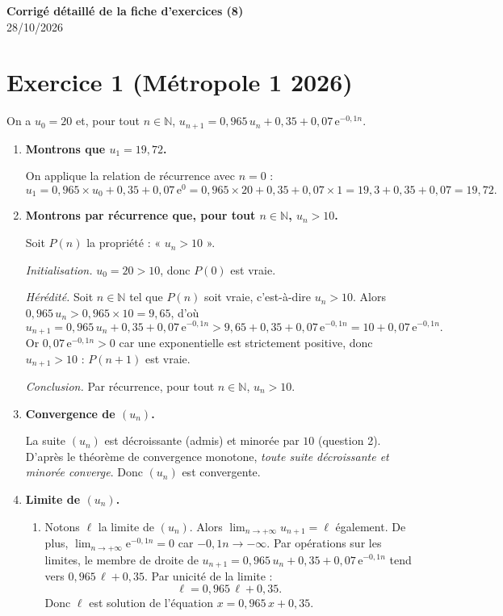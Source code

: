 \documentclass[11pt,a4paper]{article}
\newcommand{\e}{\mathrm{e}}
\newcommand{\exo}[1]{\section*{#1}}
\begin{document}
\begin{center}
{\Large\bfseries Corrigé détaillé de la fiche d'exercices (8)}\\[2pt]
28/10/2026
\end{center}

\exo{Exercice 1 (Métropole 1 2026)}

On a $u_0 = 20$ et, pour tout $n\in\mathbb{N}$,
$u_{n+1} = 0{,}965\,u_n + 0{,}35 + 0{,}07\,\e^{-0{,}1n}$.

\begin{enumerate}

\item \textbf{Montrons que $u_1 = 19{,}72$.}

On applique la relation de récurrence avec $n=0$ :
\[
u_1 = 0{,}965\times u_0 + 0{,}35 + 0{,}07\,\e^{0}
= 0{,}965\times 20 + 0{,}35 + 0{,}07\times 1
= 19{,}3 + 0{,}35 + 0{,}07 = 19{,}72.
\]

\item \textbf{Montrons par récurrence que, pour tout $n\in\mathbb{N}$, $u_n > 10$.}

Soit $P(n)$ la propriété : « $u_n > 10$ ».

\emph{Initialisation.} $u_0 = 20 > 10$, donc $P(0)$ est vraie.

\emph{Hérédité.} Soit $n\in\mathbb{N}$ tel que $P(n)$ soit vraie, c'est-à-dire $u_n > 10$.
Alors $0{,}965\,u_n > 0{,}965\times 10 = 9{,}65$, d'où
\[
u_{n+1} = 0{,}965\,u_n + 0{,}35 + 0{,}07\,\e^{-0{,}1n}
> 9{,}65 + 0{,}35 + 0{,}07\,\e^{-0{,}1n}
= 10 + 0{,}07\,\e^{-0{,}1n}.
\]
Or $0{,}07\,\e^{-0{,}1n} > 0$ car une exponentielle est strictement positive, donc $u_{n+1} > 10$ : $P(n+1)$ est vraie.

\emph{Conclusion.} Par récurrence, pour tout $n\in\mathbb{N}$, $u_n > 10$.

\item \textbf{Convergence de $(u_n)$.}

La suite $(u_n)$ est décroissante (admis) et minorée par $10$ (question 2).
D'après le théorème de convergence monotone, \emph{toute suite décroissante et minorée converge}.
Donc $(u_n)$ est convergente.

\item \textbf{Limite de $(u_n)$.}

\begin{enumerate}
\item Notons $\ell$ la limite de $(u_n)$. Alors $\lim_{n\to+\infty}u_{n+1}=\ell$ également.
De plus, $\lim_{n\to+\infty}\e^{-0{,}1n}=0$ car $-0{,}1n\to-\infty$.
Par opérations sur les limites, le membre de droite de $u_{n+1} = 0{,}965\,u_n + 0{,}35 + 0{,}07\,\e^{-0{,}1n}$
tend vers $0{,}965\,\ell + 0{,}35$. Par unicité de la limite :
\[
\ell = 0{,}965\,\ell + 0{,}35.
\]
Donc $\ell$ est solution de l'équation $x = 0{,}965\,x + 0{,}35$.


\end{enumerate}
\end{enumerate}
\end{document}
